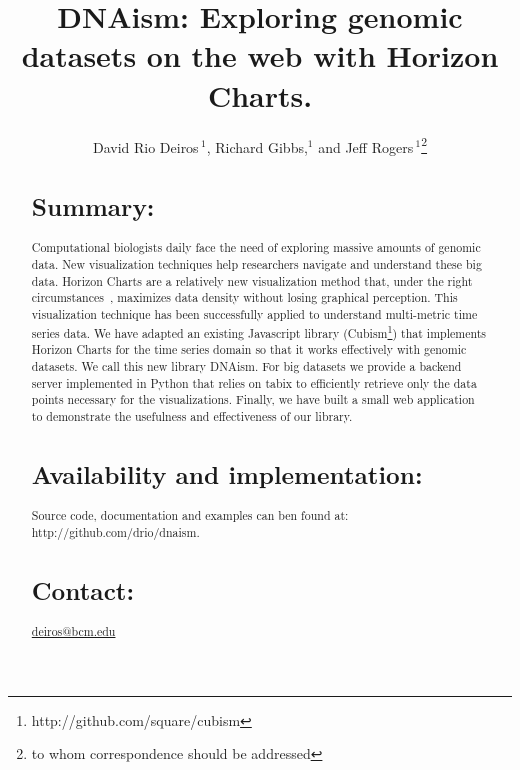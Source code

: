\documentclass{bioinfo}
\begin{document}

\title[short Title]{DNAism: Exploring genomic datasets on the web with Horizon Charts. }
\author[Sample \textit{et~al}]{David Rio Deiros\,$^{1}$, Richard Gibbs,$^{1}$ and Jeff Rogers\,$^1$\footnote{to whom correspondence should be addressed}}
\address{$^{1}$Department of Genomics, Baylor College of Medicine. }



\maketitle

\begin{abstract}

\section{Summary:}

Computational biologists daily face the need of exploring massive amounts of
genomic data. New visualization techniques help researchers navigate and
understand these big data. Horizon Charts are a relatively new visualization
method that, under the right circumstances~\citep{2009-horizon}, maximizes data
density without losing graphical perception. This visualization technique has
been successfully applied to understand multi-metric time series data. We have
adapted an existing Javascript library
(Cubism\footnote{http://github.com/square/cubism}) that implements Horizon
Charts for the time series domain so that it works effectively with genomic
datasets. We call this new library DNAism. For big datasets we provide a
backend server implemented in Python that relies on tabix\citep{tabix-li} to
efficiently retrieve only the data points necessary for the visualizations.
Finally, we have built a small web application to demonstrate the usefulness
and effectiveness of our library.

\section{Availability and implementation:}
Source code, documentation and examples can ben found at:
http://github.com/drio/dnaism.

\section{Contact:} \href{deiros@bcm.edu}{deiros@bcm.edu}
\end{abstract}
\end{document}
